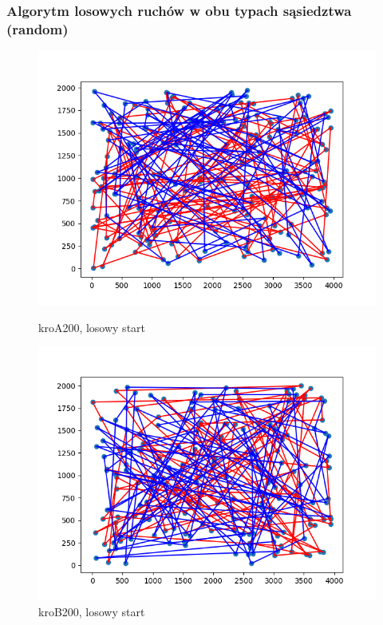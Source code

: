 \documentclass[11pt]{article}
\begin{document}
\subsubsection{Algorytm losowych ruchów w obu typach sąsiedztwa (random)}
\begin{figure}[H]
    \centering
    \begin{minipage}[t]{0.45\textwidth}
        \centering
        \includegraphics[width=\linewidth]{best_paths/kroA200/traverse_random/randomstart}
        \caption{kroA200, losowy start}
    \end{minipage}
    \hfill
    \begin{minipage}[t]{0.45\textwidth}
        \centering
        \includegraphics[width=\linewidth]{best_paths/kroB200/traverse_random/randomstart}
        \caption{kroB200, losowy start}
    \end{minipage}


\end{figure}
\end{document}
